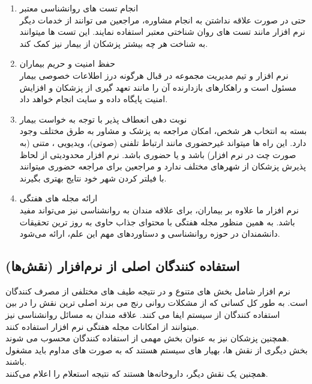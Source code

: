 \documentclass[a4paper]{article}
\begin{document}
\begin{enumerate}
			\item انجام تست های روانشناسی معتبر
			\\
			حتی در صورت علاقه نداشتن به انجام مشاوره، مراجعین می توانند از خدمات دیگر نرم افزار مانند تست های روان شناختی معتبر استفاده نمایند. این تست ها میتوانند به شناخت هر چه بیشتر پزشکان از بیمار نیز کمک کند.
			
			\item حفظ امنیت و حریم بیماران
			\\
			نرم افزار و تیم مدیریت مجموعه در قبال هرگونه درز اطلاعات خصوصی بیمار مسئول است و راهکارهای بازدارنده آن را مانند تعهد گیری از پزشکان و افزایش امنیت پایگاه داده و سایت انجام خواهد داد.
			
			\item نوبت دهی انعطاف پذیر با توجه به خواست بیمار
			\\
			بسته به انتخاب هر شخص، امکان مراجعه به پزشک و مشاور به طرق مختلف وجود دارد. این راه ها میتواند غیرحضوری مانند ارتباط تلفنی (صوتی)، ویدیویی ، متنی (به صورت چت در نرم افزار) باشد و یا حضوری باشد. نرم افزار محدودیتی از لحاظ پذیرش پزشکان از شهرهای مختلف ندارد و مراجعین برای مراجعه حضوری میتوانند با فیلتر کردن شهر خود نتایج بهتری بگیرند.
			
			\item ارائه مجله های هفتگی
			\\
			نرم افزار ما علاوه بر بیماران، برای علاقه مندان به روانشناسی نیز می‌تواند مفید باشد. به همین منظور مجله هفتگی با محتوای جذاب حاوی به روز ترین تحقیقات دانشمندان در حوزه روانشناسی و دستاوردهای مهم این علم، ارائه می‌شود.
			
			
		\end{enumerate}
				
		
		\subsection{استفاده کنندگان اصلی از نرم‌افزار (نقش‌ها)}
		نرم افزار شامل بخش های متنوع و در نتیجه طیف های مختلفی از مصرف کنندگان است. به طور کل کسانی که از مشکلات روانی رنج می برند اصلی ترین نقش را در بین استفاده کنندگان از سیستم ایفا می کنند. علاقه مندان به مسائل روانشناسی نیز میتوانند از امکانات مجله هفتگی نرم افزار استفاده کنند.
\\	همچنین پزشکان نیز به عنوان بخش مهمی از استفاده کنندگان محسوب می شوند.
\\	بخش دیگری از نقش ها، بهیار های سیستم هستند که به صورت های مداوم باید مشغول باشند.
\\   همچنین یک نقش دیگر، داروخانه‌ها هستند که نتیجه استعلام را اعلام می‌کنند.
		
\end{document}
